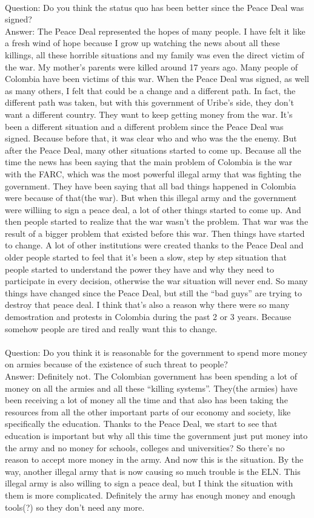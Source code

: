 \documentclass{phyasgn}\usepackage{nag}
\begin{document}
\\
Question: Do you think the status quo has been better since the Peace Deal was signed?\\
Answer: The Peace Deal represented the hopes of many people. I have felt it like a fresh wind of hope because I grow up watching the news about all these killings, all these horrible situations and my family was even the direct victim of the war. My mother’s parents were killed around 17 years ago. Many people of Colombia have been victims of this war. When the Peace Deal was signed, as well as many others, I felt that could be a change and a different path. In fact, the different path was taken, but with this government of Uribe’s side, they don’t want a different country. They want to keep getting money from the war. It’s been a different situation and a different problem since the Peace Deal was signed. Because before that, it was clear who and who was the the enemy. But after the Peace Deal, many other situations started to come up. Because all the time the news has been saying that the main problem of Colombia is the war with the FARC, which was the most powerful illegal army that was fighting the government. They have been saying that all bad things happened in Colombia were because of that(the war). But when this illegal army and the government were williing to sign a peace deal, a lot of other things started to come up. And then people started to realize that the war wasn’t the problem. That war was the result of a bigger problem that existed before this war. Then things have started to change. A lot of other institutions were created thanks to the Peace Deal and older people started to feel that it’s been a slow, step by step situation that people started to understand the power they have and why they need to participate in every decision, otherwise the war situation will never end. So many things have changed since the Peace Deal, but still the “bad guys” are trying to destroy that peace deal. I think that’s also a reason why there were so many demostration and protests in Colombia during the past 2 or 3 years. Because somehow people are tired and really want this to change. \\
\\
Question: Do you think it is reasonable for the government to spend more money on armies because of the existence of such threat to people?\\
Answer: Definitely not. The Colombian government has been spending a lot of money on all the armies and all these “killing systems”. They(the armies) have been receiving a lot of money all the time and that also has been taking the resources from all the other important parts of our economy and society, like specifically the education. Thanks to the Peace Deal, we start to see that education is important but why all this time the government just put money into the army and no money for schools, colleges and universities? So there’s no reason to accept more money in the army. And now this is the situation. By the way, another illegal army that is now causing so much trouble is the ELN. This illegal army is also willing to sign a peace deal, but I think the situation with them is more complicated. Definitely the army has enough money and enough tools(?) so they don’t need any more.\\
\end{document}
